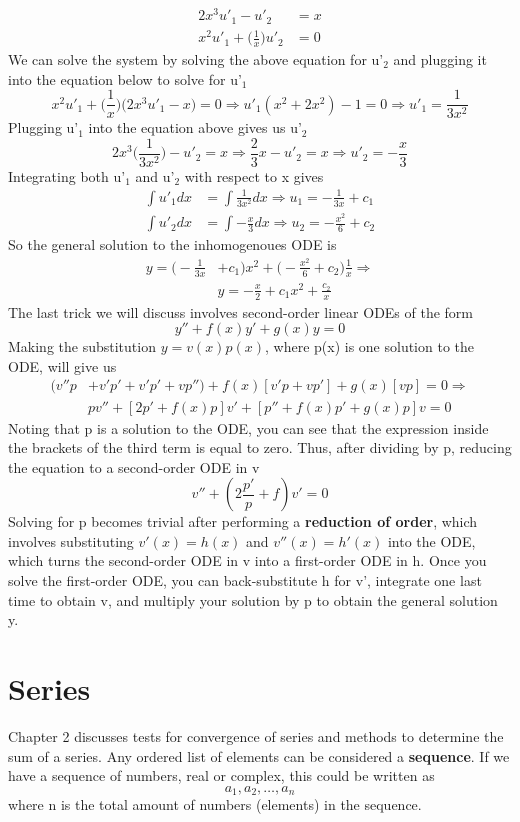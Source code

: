 \documentclass{article}
\newcommand{\be}{\begin{equation}}
\newcommand{\ee}{\end{equation}}
\begin{document}
\be
\begin{split}
  2x^3 u'_1 - u'_2 &= x \\
  x^2 u'_1 + \Big( \frac{1}{x} \Big) u'_2 &= 0
\end{split}
\ee
We can solve the system by solving the above equation for u'$_2$ and plugging it into the equation below to solve for u'$_1$
\be
x^2u'_1 + \Big( \frac{1}{x} \Big) \Big( 2x^3 u'_1 - x \Big) = 0 \Rightarrow u'_1( x^2 + 2x^2) - 1 = 0 \Rightarrow u'_1 = \frac{1}{3x^2}
\ee
Plugging u'$_1$ into the equation above gives us u'$_2$
\be
2x^3 \Big( \frac{1}{3x^2} \Big) - u'_2 = x \Rightarrow \frac{2}{3}x - u'_2 = x \Rightarrow u'_2 = - \frac{x}{3}
\ee
Integrating both u'$_1$ and u'$_2$ with respect to x gives
\be
\begin{split}
  \int u'_1 dx &= \int \frac{1}{3x^2} dx \Rightarrow u_1 = - \frac{1}{3x} + c_1 \\
  \int u'_2 dx &= \int - \frac{x}{3} dx \Rightarrow u_2 = - \frac{x^2}{6} + c_2
\end{split}
\ee
So the general solution to the inhomogenoues ODE is
\be
\begin{split}
y = \Big( - \frac{1}{3x} & + c_1 \Big) x^2 + \Big( - \frac{x^2}{6} + c_2 \Big) \frac{1}{x} \Rightarrow \\
& y = - \frac{x}{2} + c_1 x^2 + \frac{c_2}{x}
\end{split}
\ee
The last trick we will discuss involves second-order linear ODEs of the form
\be
y'' + f(x)y' + g(x)y = 0
\ee
Making the substitution $y = v(x)p(x)$, where p(x) is one solution to the ODE, will give us
\be
\begin{split}
(v''p & + v'p' + v'p' + vp'') + f(x)[v'p + vp'] + g(x)[vp] = 0 \Rightarrow \\
& pv'' + [2p' + f(x)p]v' + [p'' + f(x)p' + g(x)p]v = 0
\end{split}
\ee
Noting that p is a solution to the ODE, you can see that the expression inside the brackets of the third term is equal to zero.
Thus, after dividing by p, reducing the equation to a second-order ODE in v
\be
v'' + (2 \frac{p'}{p} + f)v' = 0
\ee
Solving for p becomes trivial after performing a \textbf{reduction of order}, which involves substituting $v'(x) = h(x)$ and $v''(x) = h'(x)$ into the ODE, which turns the second-order ODE in v into a first-order ODE in h.
Once you solve the first-order ODE, you can back-substitute h for v', integrate one last time to obtain v, and multiply your solution by p to obtain the general solution y.
\section*{Series}
Chapter 2 discusses tests for convergence of series and methods to determine the sum of a series.
Any ordered list of elements can be considered a \textbf{sequence}.
If we have a sequence of numbers, real or complex, this could be written as
\be
  a_1, a_2, \hdots, a_n
\ee
where n is the total amount of numbers (elements) in the sequence.
\end{document}

